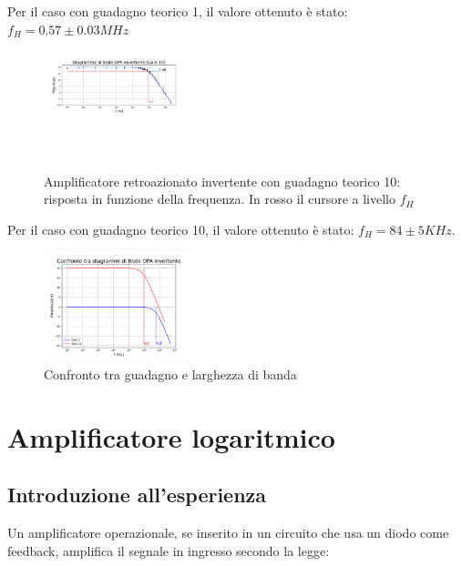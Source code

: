 \documentclass[journal]{IEEEtran}
\begin{document}
Per il caso con guadagno teorico 1, il valore ottenuto è stato:
$f_H = 0.57 \pm 0.03 MHz$

\begin{figure}[H]%
\begin {center}
\includegraphics[width=0.38\textwidth]{analysis/output/OPA-bode_gain10(mag).pdf}
\caption{Amplificatore retroazionato invertente con guadagno teorico 10: risposta in funzione della frequenza. In rosso il cursore a livello $f_H$ }
\label{fig:closed_loop_inv_gain_10}
\end {center}
\end{figure}

Per il caso con guadagno teorico 10, il valore ottenuto è stato:
$f_H = 84 \pm 5 KHz$.


\begin{figure}[H]%
\begin {center}
\includegraphics[width=0.38\textwidth]{analysis/output/OPA-bode_gain_comparison(mag).pdf}
\caption{Confronto tra guadagno e larghezza di banda}
\label{fig:OPA-bode_gain_comparison(mag)}
\end {center}
\end{figure}


\section{\textbf{Amplificatore logaritmico}} %
\subsection{\textbf{Introduzione all'esperienza}}
Un amplificatore operazionale, se inserito in un circuito che usa un diodo come feedback, amplifica il segnale in ingresso secondo la legge:
\end{document}
